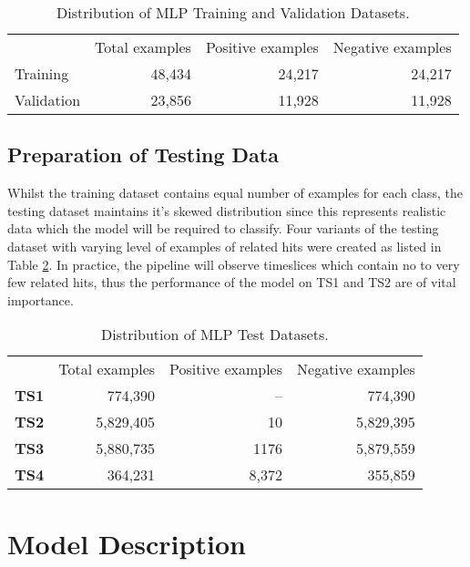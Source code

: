 \begin{table}[htb]
  \centering
  \caption{Distribution of MLP Training and Validation Datasets.}
  \begin{tabular}{lrrr}
    \hline
    & Total examples & Positive examples & Negative examples \\
    Training & 48,434 & 24,217 & 24,217 \\
    Validation & 23,856 & 11,928 & 11,928 \\
    \hline
  \end{tabular}
  \label{tab:mlp-train-dist}  
\end{table}

\subsection{Preparation of Testing Data}
\label{sec:mlp-data-prep-test}

Whilst the training dataset contains equal number of examples for each
class, the testing dataset maintains it's skewed distribution since
this represents realistic data which the model will be required to
classify. Four variants of the testing dataset with varying level of
examples of related hits were created as listed in Table
\ref{tab:mlp-test-dist}. In practice, the pipeline will observe
timeslices which contain no to very few related hits, thus the
performance of the model on TS1 and TS2 are of vital importance.

\begin{table}[htb]
  \centering
  \caption{Distribution of MLP Test Datasets.}
  \begin{tabular}{lrrr}
    \hline
    & Total examples & Positive examples & Negative examples \\
    \textbf{TS1} & 774,390 & -- & 774,390 \\
    \textbf{TS2} & 5,829,405 & 10 & 5,829,395 \\
    \textbf{TS3} & 5,880,735 & 1176 & 5,879,559 \\
    \textbf{TS4} & 364,231 & 8,372 & 355,859 \\
    \hline
  \end{tabular}
  \label{tab:mlp-test-dist}
\end{table}

\section{Model Description}
\label{sec:mlp-model-desc}

